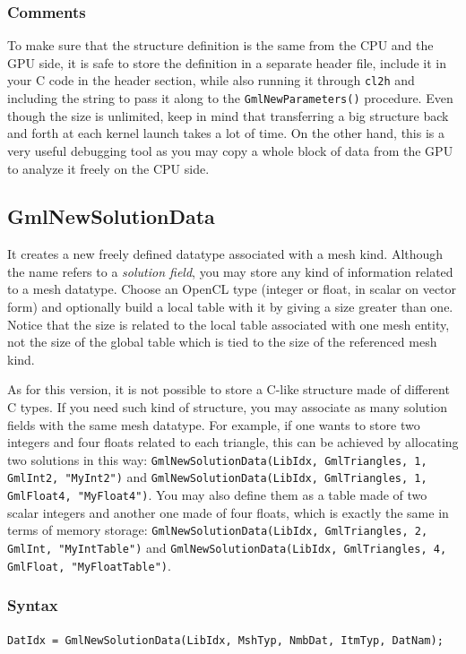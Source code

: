 \documentclass[a4paper,12pt]{article}
\begin{document}
\subsubsection*{Comments}
To make sure that the structure definition is the same from the CPU and the GPU side, it is safe to store the definition in a separate header file, include it in your C code in the header section, while also running it through {\tt cl2h} and including the string to pass it along to the  {\tt GmlNewParameters()} procedure. Even though the size is unlimited, keep in mind that transferring a big structure back and forth at each kernel launch takes a lot of time. On the other hand, this is a very useful debugging tool as you may copy a whole block of data from the GPU to analyze it freely on the CPU side.


\subsection{GmlNewSolutionData}
It creates a new freely defined datatype associated with a mesh kind. Although the name refers to a \emph{solution field}, you may store any kind of information related to a mesh datatype. Choose an OpenCL type (integer or float, in scalar on vector form) and optionally build a local table with it by giving a size greater than one. Notice that the size is related to the local table associated with one mesh entity, not the size of the global table which is tied to the size of the referenced mesh kind.

As for this version, it is not possible to store a C-like structure made of different C types. If you need such kind of structure, you may associate as many solution fields with the same mesh datatype. For example, if one wants to store two integers and four floats related to each triangle, this can be achieved by allocating two solutions in this way: {\tt GmlNewSolutionData(LibIdx, GmlTriangles, 1, GmlInt2, "MyInt2")} and {\tt GmlNewSolutionData(LibIdx, GmlTriangles, 1, GmlFloat4, "MyFloat4")}. You may also define them as a table made of two scalar integers and another one made of four floats, which is exactly the same in terms of memory storage: {\tt GmlNewSolutionData(LibIdx, GmlTriangles, 2, GmlInt, "MyIntTable")} and {\tt GmlNewSolutionData(LibIdx, GmlTriangles, 4, GmlFloat, "MyFloatTable")}.

\subsubsection*{Syntax}
{\tt DatIdx = GmlNewSolutionData(LibIdx, MshTyp, NmbDat, ItmTyp, DatNam);}
\end{document}
